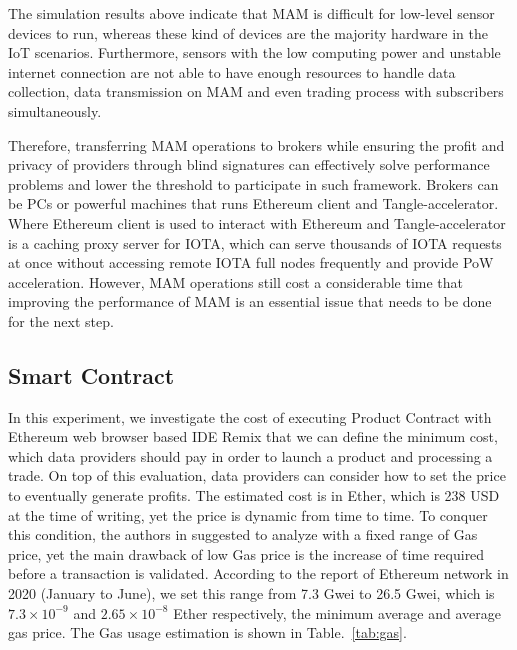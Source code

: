 \documentclass[conference]{IEEEtran}
\begin{document}
The simulation results above indicate that MAM is difficult for low-level sensor devices to run, whereas these kind of devices are the majority hardware in the IoT scenarios. Furthermore, sensors with the low computing power and unstable internet connection are not able to have enough resources to handle data collection, data transmission on MAM and even trading process with subscribers simultaneously. 

Therefore, transferring MAM operations to brokers while ensuring the profit and privacy of providers through blind signatures can effectively solve performance problems and lower the threshold to participate in such framework. Brokers can be PCs or powerful machines that runs Ethereum client and Tangle-accelerator\cite{TA}. Where Ethereum client is used to interact with Ethereum and Tangle-accelerator is a caching proxy server for IOTA, which can serve thousands of IOTA requests at once without accessing remote IOTA full nodes frequently and provide PoW acceleration. However, MAM operations still cost a considerable time that improving the performance of MAM is an essential issue that needs to be done for the next step.

\subsection{Smart Contract}
In this experiment, we investigate the cost of executing Product Contract with Ethereum web browser based IDE Remix that we can define the minimum cost, which data providers should pay in order to launch a product and processing a trade.  On top of this evaluation, data providers can consider how to set the price to eventually generate profits. The estimated cost is in Ether, which is 238 USD at the time of writing, yet the price is dynamic from time to time. To conquer this condition, the authors in \cite{MindMyValue} suggested to analyze with a fixed range of Gas price,  yet the main drawback of low Gas price is the increase of time required before a transaction is validated. According to the report of Ethereum network\cite{ethereumChart} in 2020 (January to June), we set this range from 7.3 Gwei to 26.5 Gwei, which is $7.3 \times 10^{-9}$ and $2.65 \times 10^{-8}$ Ether respectively, the minimum average and average gas price. The Gas usage estimation is shown in Table.~\ref{tab:gas}.
\end{document}
